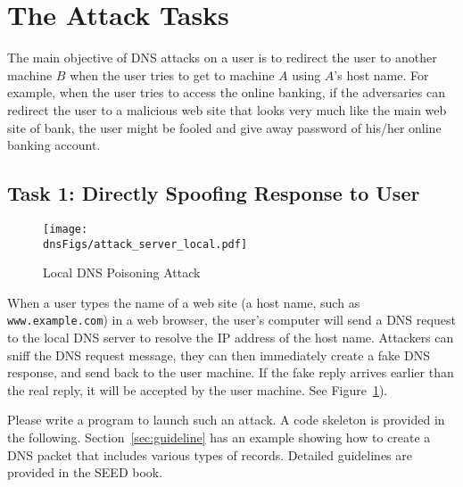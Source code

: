 








\section{The Attack Tasks}


The main objective of DNS attacks on a user is to redirect the user
to another machine $B$ when the user tries to get to machine $A$ using
$A$'s host name. For example, when the user tries to access the online banking,
if the adversaries can redirect the user 
to a malicious web site that looks very much like the main web site 
of bank, the user might be fooled and give away password
of his/her online banking account.


\subsection{Task 1: Directly Spoofing Response to User}



\begin{figure}[htb]
\centering
\texttt{[image: \\dnsFigs/attack\_server\_local.pdf]}
\caption{Local DNS Poisoning Attack}
\label{dns:fig:local_attack}
\end{figure}


When a user types the name of a web site (a host name, such as {\tt
www.example.com}) in a web browser, the user's computer will send a DNS 
request to the local DNS server to resolve the IP address of the host name.  
Attackers can sniff the DNS request message,
they can then immediately create a fake DNS response, 
and send back to the user machine. If the fake reply arrives
earlier than the real reply, it will be accepted by the user machine.
See Figure~\ref{dns:fig:local_attack}). 

Please write a program to launch such an attack. A code 
skeleton is provided in the following. Section~\ref{sec:guideline}
has an example showing how to create a DNS packet that includes 
various types of records. Detailed guidelines are 
provided in the SEED book. 


